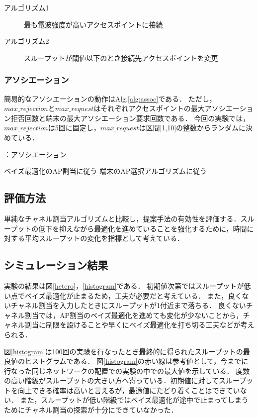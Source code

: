 \documentclass[a4paper,11pt]{jarticle}
\begin{document}
\begin{description}
  \item[アルゴリズム1]最も電波強度が高いアクセスポイントに接続
  \item[アルゴリズム2]スループットが閾値以下のとき接続先アクセスポイントを変更
\end{description}

\subsubsection{アソシエーション}
簡易的なアソシエーションの動作はAlg.\ref{alg:assoc}である．
ただし，$max\_rejection$と$max\_request$はそれぞれアクセスポイントの最大アソシエーション拒否回数と端末の最大アソシエーション要求回数である．
今回の実験では，$max\_rejection$は5回に固定し，$max\_request$は区間[1,10]の整数からランダムに決めている．

\begin{algorithm}[H]
  \caption{：アソシエーション}
  \label{alg:assoc}
  \begin{algorithmic}[1]
      \State ベイズ最適化のAP割当に従う
    \Else
      \State 端末のAP選択アルゴリズムに従う
    \EndIf
  \end{algorithmic}
\end{algorithm}

\subsection{評価方法}
単純なチャネル割当アルゴリズムと比較し，提案手法の有効性を評価する．スループットの低下を抑えながら最適化を進めていることを強化するために，時間に対する平均スループットの変化を指標として考えている．

\subsection{シミュレーション結果}
実験の結果は図\ref{hetero}，\ref{histogram}である．
初期値次第ではスループットが低い点でベイズ最適化が止まるため，工夫が必要だと考えている．
また，良くないチャネル割当を入力したときにスループットが1付近まで落ちる．
良くないチャネル割当では，AP割当のベイズ最適化を進めても変化が少ないことから，チャネル割当に制限を設けることや早くにベイズ最適化を打ち切る工夫などが考えられる．

図\ref{histogram}は100回の実験を行なったとき最終的に得られたスループットの最良値のヒストグラムである．
図\ref{histogram}の赤い線は参考値として，今までに行なった同じネットワークの配置での実験の中での最大値を示している．
度数の高い階級がスループットの大きい方へ寄っている．初期値に対してスループットを向上できる確率は高いと言えるが，最適値にたどり着くことはできていない．
また，スループットが低い階級ではベイズ最適化が途中で止まってしまうためにチャネル割当の探索が十分にできていなかった．
\end{document}
